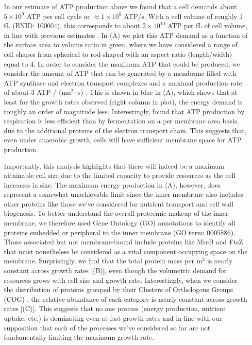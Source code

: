 In our estimate of ATP production above we found that a cell demands about $5
\times 10^9$ ATP per cell cycle or $\approx 1 \times 10^6$ ATP/s. With a cell
volume of roughly 1 fL (BNID: 100004), this corresponds to about $2 \times
10^{10}$ ATP per fL of cell volume, in line with previous estimates
\citep{stouthamer1977, szenk2017}. In (A) we plot this ATP
demand as a function of the surface area to volume ratio in green, where we have
considered a range of cell shapes from spherical to rod-shaped with an aspect
ratio (length/width) equal to 4. In order to consider the maximum ATP that could
be produced, we consider the amount of ATP that can be generated by a membrane
filled with ATP synthase and electron transport complexes and a maximal
production rate of about 3 ATP / (nm$^2 \cdot$s) \citep{szenk2017}. This is
shown in blue in (A), which shows that at least for the
growth rates observed (right column in plot), the energy demand is roughly an
order of magnitude less. Interestingly, \cite{szenk2017} found that ATP
production by respiration is less efficient than by fermentation on a per
membrane area basis, due to the additional proteins of the electron transport
chain. This suggests that, even under anaerobic growth, cells will have
sufficient membrane space for ATP production.

Importantly, this analysis highlights that there will indeed be a maximum
attainable cell size due to the limited capacity to provide resources as the
cell increases in size. The maximum energy production in
(A), however, does represent a somewhat unachievable limit
since the inner membrane also includes other proteins like those we've
considered for nutrient transport and cell wall biogenesis. To better understand
the overall proteomic makeup of the inner membrane, we therefore used Gene
Ontology (GO) annotations \citep{ashburner2000, thegeneOntologyconsortium2018}
to identify all proteins embedded or peripheral to the inner membrane (GO term:
0005886). Those associated but not membrane-bound include proteins like MreB and
FtsZ that must nonetheless be considered as a vital component occupying space on
the membrane. Surprisingly, we find that the total protein mass per \textmu
m$^2$ is nearly constant across growth rates [(B)],
even though the volumetric demand for resources grows with cell size and growth
rate. Interestingly, when we consider the distribution of proteins grouped by
their Clusters of Orthologous Groups (COG) \citep{tatusov2000}, the relative
abundance of each category is nearly constant across growth rates
[(C)]. This suggests that no one process (energy production,
nutrient uptake, etc.) is dominating even at fast growth rates and in line with
our supposition that each of the processes we've considered so far are not
fundamentally limiting the maximum growth rate.

